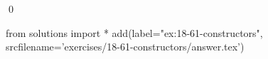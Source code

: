 
\begin{ex}
  \label{ex:18-61-constructors}
  
  \qed
\end{ex}
\begin{python0}
from solutions import *
add(label="ex:18-61-constructors",
    srcfilename='exercises/18-61-constructors/answer.tex')
\end{python0}
